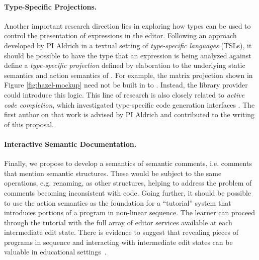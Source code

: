 \paragraph{Type-Specific Projections.} Another important research
direction lies in exploring how types can be used to control  
the presentation of expressions in the editor. Following an
approach developed by PI Aldrich in a textual setting of \emph{type-specific
languages} (TSLs), it should be possible to have the type that an
expression is being analyzed against define a \emph{type-specific projection} defined by elaboration to the underlying static semantics and action semantics of \HazelEnv \citep{TSLs}. For example, the matrix projection shown in Figure \ref{fig:hazel-mockup} need not be built in to \HazelEnv. Instead, the  library provider could introduce this logic. This line of research is also closely related to \emph{active code completion}, which investigated type-specific code generation interfaces \citep{Omar:2012:ACC:2337223.2337324}. The first author on that work is advised by PI Aldrich and contributed to the writing of this proposal.

\paragraph{Interactive Semantic Documentation.} Finally, we propose
to develop a semantics of semantic comments, 
i.e. comments that mention semantic structures. These would be subject to
the same operations, e.g. renaming, as other structures, helping to address
the problem of comments becoming inconsistent with code. Going further, it should be possible to use the 
action semantics as the foundation for a ``tutorial'' system that introduces portions of a program in non-linear
sequence. The learner can proceed through the tutorial with the full array of
editor services available at each intermediate edit state. There is evidence to
suggest that revealing pieces of programs in sequence and interacting with
intermediate edit states can be valuable in educational settings~\citep{Bennedsen:2005:RPP:1047344.1047413,Paxton:2002:LPL:771322.771332}.  

